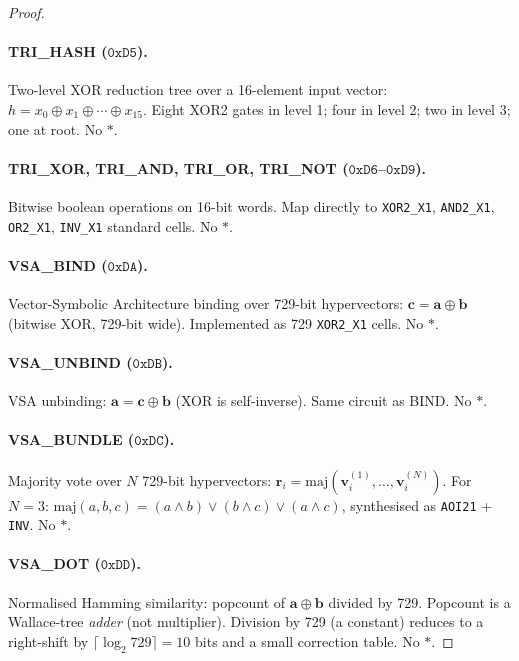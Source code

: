\begin{proof}
\paragraph{TRI\_HASH ($\mathtt{0xD5}$).}
Two-level XOR reduction tree over a 16-element input vector:
$h = x_0 \oplus x_1 \oplus \cdots \oplus x_{15}$.
Eight XOR2 gates in level 1; four in level 2; two in level 3; one at root.
No $*$. \checkmark

\paragraph{TRI\_XOR, TRI\_AND, TRI\_OR, TRI\_NOT
  ($\mathtt{0xD6}$--$\mathtt{0xD9}$).}
Bitwise boolean operations on 16-bit words.
Map directly to \texttt{XOR2\_X1}, \texttt{AND2\_X1},
\texttt{OR2\_X1}, \texttt{INV\_X1} standard cells. No $*$. \checkmark

\paragraph{VSA\_BIND ($\mathtt{0xDA}$).}
Vector-Symbolic Architecture binding over 729-bit hypervectors:
$\mathbf{c} = \mathbf{a} \oplus \mathbf{b}$ (bitwise XOR, 729-bit wide).
Implemented as 729 \texttt{XOR2\_X1} cells. No $*$. \checkmark

\paragraph{VSA\_UNBIND ($\mathtt{0xDB}$).}
VSA unbinding: $\mathbf{a} = \mathbf{c} \oplus \mathbf{b}$
(XOR is self-inverse). Same circuit as BIND. No $*$. \checkmark

\paragraph{VSA\_BUNDLE ($\mathtt{0xDC}$).}
Majority vote over $N$ 729-bit hypervectors:
$\mathbf{r}_i = \mathrm{maj}(\mathbf{v}^{(1)}_i, \ldots, \mathbf{v}^{(N)}_i)$.
For $N=3$: $\mathrm{maj}(a,b,c) = (a \wedge b) \vee (b \wedge c) \vee (a \wedge c)$,
synthesised as \texttt{AOI21} + \texttt{INV}. No $*$. \checkmark

\paragraph{VSA\_DOT ($\mathtt{0xDD}$).}
Normalised Hamming similarity: popcount of
$\mathbf{a} \oplus \mathbf{b}$ divided by 729.
Popcount is a Wallace-tree \emph{adder} (not multiplier).
Division by 729 (a constant) reduces to a right-shift by $\lceil \log_2 729 \rceil = 10$
bits and a small correction table. No $*$. \checkmark


\end{proof}
